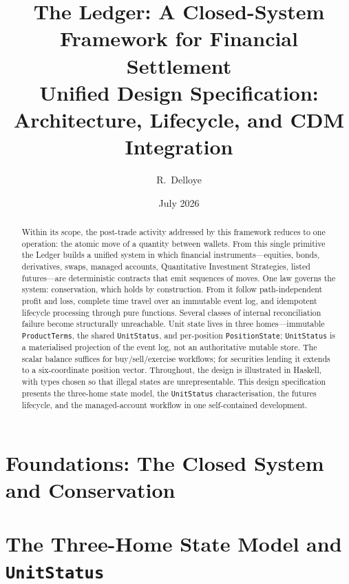 \documentclass[11pt,a4paper]{article}
\title{The Ledger: A Closed-System Framework for Financial Settlement\\[6pt]
\large Unified Design Specification: Architecture, Lifecycle, and CDM Integration}
\author{R.\ Delloye}
\date{July 2026}
\begin{document}
\maketitle

\begin{abstract}
Within its scope, the post-trade activity addressed by this framework reduces to one operation: the
atomic move of a quantity between wallets. From this single primitive the Ledger builds a unified system
in which financial instruments---equities, bonds, derivatives, swaps, managed accounts, Quantitative
Investment Strategies, listed futures---are deterministic contracts that emit sequences of moves. One law
governs the system: conservation, which holds by construction. From it follow path-independent profit and
loss, complete time travel over an immutable event log, and idempotent lifecycle processing through pure
functions. Several classes of internal reconciliation failure become structurally unreachable. Unit
state lives in three homes---immutable \texttt{ProductTerms}, the shared \texttt{UnitStatus}, and
per-position \texttt{PositionState}; \texttt{UnitStatus} is a materialised projection of the event log,
not an authoritative mutable store. The scalar balance suffices for buy/sell/exercise workflows; for
securities lending it extends to a six-coordinate position vector. Throughout, the design is illustrated
in Haskell, with types chosen so that illegal states are unrepresentable. This design
specification presents the three-home state model, the \texttt{UnitStatus} characterisation,
the futures lifecycle, and the managed-account workflow in one self-contained development.
\end{abstract}

\tableofcontents
\clearpage


\part{Foundations: The Closed System and Conservation}



\part{The Three-Home State Model and \texorpdfstring{\texttt{UnitStatus}}{UnitStatus}}

\end{document}
